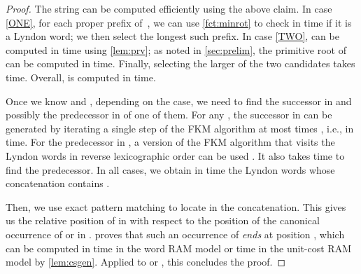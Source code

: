 \documentclass{article}
\newcommand{\mayqed}{}
\theoremstyle{definition}
\theoremstyle{remark}
\begin{document}
\begin{proof}
  The string  can be computed efficiently using the above claim.
  In case \ref{ONE}, for each proper prefix of~, we can use \cref{fct:minrot} to check in  time if it is a Lyndon word; we then select the longest such prefix.
  In case \ref{TWO},  can be computed in  time using \cref{lem:prv}; as noted in \cref{sec:prelim}, the primitive root of  can be computed in  time.
  Finally, selecting the larger of the two candidates takes  time.
  Overall,  is computed in  time.

  Once we know  and , depending on the case, we need to find the successor in 
  and possibly the predecessor in  of one of them. 
  For any , the successor  in  can be generated by iterating a single step of the FKM algorithm at most
   times \cite{FK}, i.e., in  time.
  For the predecessor in , a version of the FKM algorithm that visits the Lyndon words
  in reverse lexicographic order can be used \cite{Knuth}.
  It also takes  time to find the predecessor.
  In all cases, we obtain in  time the Lyndon words whose concatenation contains .
  
  Then, we use exact pattern matching to locate  in the concatenation.
  This gives us the relative position of  in  with respect to the position of the canonical occurrence of  or  in .
   proves that such an occurrence of  \emph{ends} at position
  , which can be computed in  time in the word RAM model
  or  time in the unit-cost RAM model by \cref{lem:csgen}.
  Applied to  or , this concludes the proof.
\mayqed\end{proof}
\end{document}
